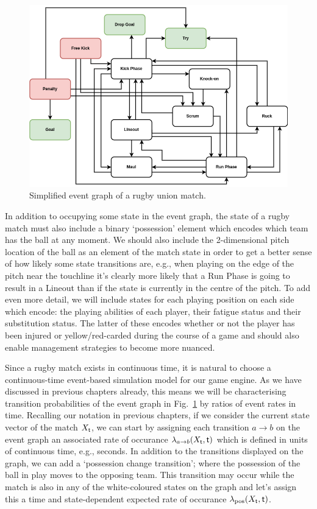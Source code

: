\begin{figure}[h]
\includegraphics[width=14cm]{images/trywizard-event-graph.drawio.png}
\caption{Simplified event graph of a rugby union match.}
\label{fig:event-graph}
\end{figure}

In addition to occupying some state in the event graph, the state of a rugby match must also include a binary `possession' element which encodes which team has the ball at any moment. We should also include the 2-dimensional pitch location of the ball as an element of the match state in order to get a better sense of how likely some state transitions are, e.g., when playing on the edge of the pitch near the touchline it's clearly more likely that a {\sf Run Phase} is going to result in a {\sf Lineout} than if the state is currently in the centre of the pitch. To add even more detail, we will include states for each playing position on each side which encode: the playing abilities of each player, their fatigue status and their substitution status. The latter of these encodes whether or not the player has been injured or yellow/red-carded during the course of a game and should also enable management strategies to become more nuanced.

Since a rugby match exists in continuous time, it is natural to choose a continuous-time event-based simulation model for our game engine. As we have discussed in previous chapters already, this means we will be characterising transition probabilities of the event graph in Fig.~\ref{fig:event-graph} by ratios of event rates in time. Recalling our notation in previous chapters, if we consider the current state vector of the match $X_{\sf t}$, we can start by assigning each transition $a\rightarrow b$ on the event graph an associated rate of occurance $\lambda_{a\rightarrow b} (X_{\sf t}, {\sf t})$ which is defined in units of continuous time, e.g., seconds. In addition to the transitions displayed on the graph, we can add a `possession change transition'; where the possession of the ball in play moves to the opposing team. This transition may occur while the match is also in any of the white-coloured states on the graph and let's assign this a time and state-dependent expected rate of occurance $\lambda_{\rm pos}(X_{\sf t}, {\sf t})$.

